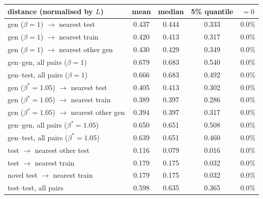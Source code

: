\begin{tabular}{lcccc}
\toprule
distance (normalised by $L$) & mean & median & 5\% quantile & $=0$ \\
\midrule
gen ($\beta=1$) $\to$ nearest test & 0.437 & 0.444 & 0.333 & 0.0\% \\
gen ($\beta=1$) $\to$ nearest train & 0.420 & 0.413 & 0.317 & 0.0\% \\
gen ($\beta=1$) $\to$ nearest other gen & 0.430 & 0.429 & 0.349 & 0.0\% \\
gen--gen, all pairs ($\beta=1$) & 0.679 & 0.683 & 0.540 & 0.0\% \\
gen--test, all pairs ($\beta=1$) & 0.666 & 0.683 & 0.492 & 0.0\% \\
\midrule
gen ($\beta^*=1.05$) $\to$ nearest test & 0.405 & 0.413 & 0.302 & 0.0\% \\
gen ($\beta^*=1.05$) $\to$ nearest train & 0.389 & 0.397 & 0.286 & 0.0\% \\
gen ($\beta^*=1.05$) $\to$ nearest other gen & 0.394 & 0.397 & 0.317 & 0.0\% \\
gen--gen, all pairs ($\beta^*=1.05$) & 0.650 & 0.651 & 0.508 & 0.0\% \\
gen--test, all pairs ($\beta^*=1.05$) & 0.639 & 0.651 & 0.460 & 0.0\% \\
\midrule
test $\to$ nearest other test & 0.116 & 0.079 & 0.016 & 0.0\% \\
test $\to$ nearest train & 0.179 & 0.175 & 0.032 & 0.0\% \\
novel test $\to$ nearest train & 0.179 & 0.175 & 0.032 & 0.0\% \\
test--test, all pairs & 0.598 & 0.635 & 0.365 & 0.0\% \\
\bottomrule
\end{tabular}